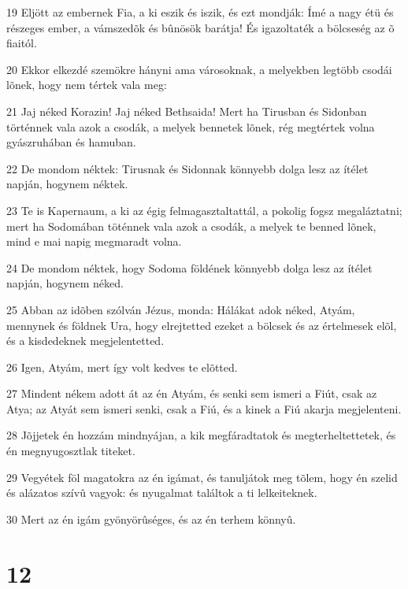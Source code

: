 \par 19 Eljött az embernek Fia, a ki eszik és iszik, és ezt mondják: Ímé a nagy étü és részeges ember, a vámszedõk és bûnösök barátja! És igazoltaték a bölcseség az õ fiaitól.
\par 20 Ekkor elkezdé szemökre hányni ama városoknak, a melyekben legtöbb csodái lõnek, hogy nem tértek vala meg:
\par 21 Jaj néked Korazin! Jaj néked Bethsaida! Mert ha Tirusban és Sidonban történnek vala azok a csodák, a melyek bennetek lõnek,  rég megtértek volna gyászruhában és hamuban.
\par 22 De mondom néktek: Tirusnak és Sidonnak könnyebb dolga lesz az ítélet napján, hogynem néktek.
\par 23 Te is Kapernaum, a ki az égig felmagasztaltattál, a pokolig fogsz megaláztatni; mert ha Sodomában töténnek vala azok a csodák, a melyek te benned lõnek, mind e mai napig megmaradt volna.
\par 24 De mondom néktek, hogy Sodoma földének könnyebb dolga lesz az ítélet napján, hogynem néked.
\par 25 Abban az idõben szólván Jézus, monda: Hálákat adok néked, Atyám, mennynek és földnek Ura, hogy elrejtetted ezeket a bölcsek és az értelmesek elõl, és a kisdedeknek megjelentetted.
\par 26 Igen, Atyám, mert így volt kedves te elõtted.
\par 27 Mindent nékem adott át az én Atyám, és senki sem ismeri a Fiút, csak az Atya; az Atyát sem ismeri senki, csak a Fiú, és a kinek a Fiú akarja megjelenteni.
\par 28 Jõjjetek én hozzám mindnyájan, a kik megfáradtatok és megterheltettetek, és én megnyugosztlak titeket.
\par 29 Vegyétek föl magatokra az én igámat, és tanuljátok meg tõlem, hogy én szelid és alázatos szívû vagyok: és nyugalmat találtok a ti lelkeiteknek.
\par 30 Mert az én igám gyönyörûséges, és az én terhem könnyû.

\chapter{12}


